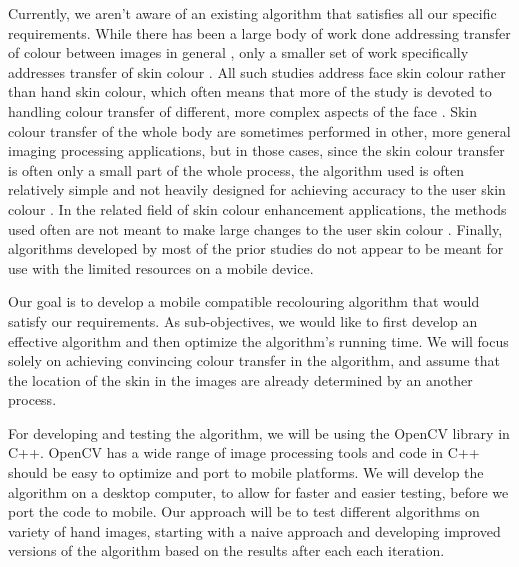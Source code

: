 \documentclass[12pt, a4paper]{article}
\begin{document}
Currently, we aren't aware of an existing algorithm that satisfies all our specific requirements. While there has been a large body of work done addressing transfer of colour between images in general \cite{reinhard_2001_transfer, pitie_2005_pdf, chen_2014_propagation, chang_2015_palette, zhang_2017_decomposition}, only a smaller set of work specifically addresses transfer of skin colour \cite{yin_2004_transfer, seo_2005_transfer, yang_2017_semantic}. All such studies address face skin colour rather than hand skin colour, which often means that more of the study is devoted to handling colour transfer of different, more complex aspects of the face \cite{yang_2017_semantic}. Skin colour transfer of the whole body are sometimes performed in other, more general imaging processing applications, but in those cases, since the skin colour transfer is often only a small part of the whole process, the algorithm used is often relatively simple and not heavily designed for achieving accuracy to the user skin colour \cite{shilkrot_2013_garment, li_2015_replace}. In the related field of skin colour enhancement applications, the methods used often are not meant to make large changes to the user skin colour \cite{aradhye_2009_enhancement, lee_2010_mobile}. Finally, algorithms developed by most of the prior studies do not appear to be meant for use with the limited resources on a mobile device.

Our goal is to develop a mobile compatible recolouring algorithm that would satisfy our requirements. As sub-objectives, we would like to first develop an effective algorithm and then optimize the algorithm's running time. We will focus solely on achieving convincing colour transfer in the algorithm, and assume that the location of the skin in the images are already determined by an another process. 

For developing and testing the algorithm, we will be using the OpenCV library in C++. OpenCV has a wide range of image processing tools and code in C++ should be easy to optimize and port to mobile platforms. We will develop the algorithm on a desktop computer, to allow for faster and easier testing, before we port the code to mobile. Our approach will be to test different algorithms on variety of hand images, starting with a naive approach and developing improved versions of the algorithm based on the results after each each iteration.

\pagebreak



\pagebreak
\end{document}
